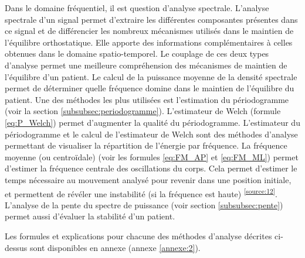 Dans le domaine fréquentiel, il est question d’analyse spectrale. 
L’analyse spectrale d’un signal permet d’extraire les différentes composantes présentes dans ce signal et de différencier les nombreux mécanismes utilisés dans le maintien de l’équilibre orthostatique. 
Elle apporte des informations complémentaires à celles obtenues dans le domaine spatio-temporel. 
Le couplage de ces deux types d’analyse permet une meilleure compréhension des mécanismes de maintien de l’équilibre d’un patient. 
Le calcul de la puissance moyenne de la densité spectrale permet de déterminer quelle fréquence domine dans le maintien de l’équilibre du patient. 
Une des méthodes les plus utilisées est l'estimation du périodogramme (voir la section \ref{subsubsec:periodogramme}).
L'estimateur de Welch (formule \ref{eq:P_Welch}) permet d'augmenter la qualité du périodogramme.
L'estimateur du périodogramme et le calcul de l'estimateur de Welch sont des méthodes d'analyse permettant de visualiser la répartition de l'énergie par fréquence.
La fréquence moyenne (ou centroïdale) (voir les formules \ref{eq:FM_AP} et \ref{eq:FM_ML}) permet d’estimer la fréquence centrale des oscillations du corps. 
Cela permet d'estimer le temps nécessaire au mouvement analysé pour revenir dans une position initiale, et permettent de révéler une instabilité (si la fréquence est haute) \textsuperscript{\ref{source:12}}. 
L’analyse de la pente du spectre de puissance (voir section \ref{subsubsec:pente}) permet aussi d’évaluer la stabilité d’un patient.

Les formules et explications pour chacune des méthodes d’analyse décrites ci-dessus sont disponibles en annexe (annexe \ref{annexe:2}).

